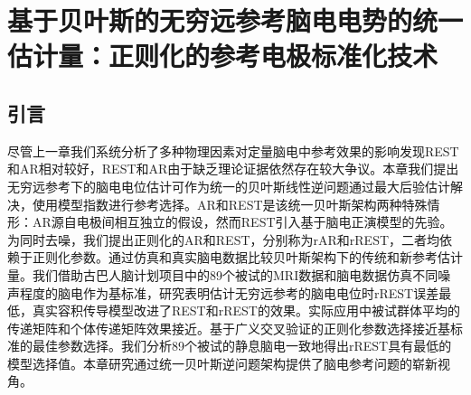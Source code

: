 \chapter{基于贝叶斯的无穷远参考脑电电势的统一估计量：正则化的参考电极标准化技术}
\section{引言}
尽管上一章我们系统分析了多种物理因素对定量脑电中参考效果的影响发现REST和AR相对较好，REST和AR由于缺乏理论证据依然存在较大争议。本章我们提出无穷远参考下的脑电电位估计可作为统一的贝叶斯线性逆问题通过最大后验估计解决，使用模型指数进行参考选择。AR和REST是该统一贝叶斯架构两种特殊情形：AR源自电极间相互独立的假设，然而REST引入基于脑电正演模型的先验。为同时去噪，我们提出正则化的AR和REST，分别称为rAR和rREST，二者均依赖于正则化参数。通过仿真和真实脑电数据比较贝叶斯架构下的传统和新参考估计量。我们借助古巴人脑计划项目中的89个被试的MRI数据和脑电数据仿真不同噪声程度的脑电作为基标准，研究表明估计无穷远参考的脑电电位时rREST误差最低，真实容积传导模型改进了REST和rREST的效果。实际应用中被试群体平均的传递矩阵和个体传递矩阵效果接近。基于广义交叉验证的正则化参数选择接近基标准的最佳参数选择。我们分析89个被试的静息脑电一致地得出rREST具有最低的模型选择值。本章研究通过统一贝叶斯逆问题架构提供了脑电参考问题的崭新视角。
